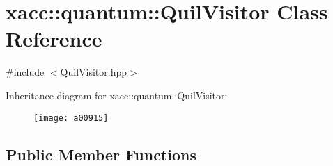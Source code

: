 \hypertarget{a00915}{}\section{xacc\+:\+:quantum\+:\+:Quil\+Visitor Class Reference}
\label{a00915}


{\ttfamily \#include $<$Quil\+Visitor.\+hpp$>$}

Inheritance diagram for xacc\+:\+:quantum\+:\+:Quil\+Visitor\+:\begin{figure}[H]
\begin{center}
\leavevmode
\texttt{[image: a00915]}
\end{center}
\end{figure}
\subsection*{Public Member Functions}
